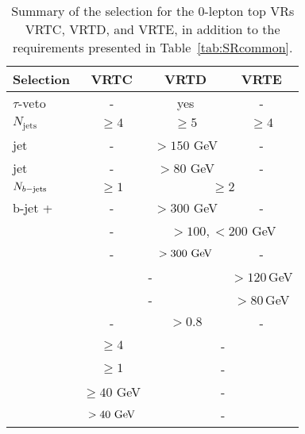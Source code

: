 	\begin{table}[htpb]
	  \caption{Summary of the selection for the $0$-lepton top \acp{VR} VRTC, VRTD, and VRTE, in addition to the requirements presented in Table~\ref{tab:SRcommon}.}
	  \begin{center}
	    \def\arraystretch{1.4}%
	    \begin{tabular}{lccc}
	    \toprule
	      \textbf{Selection}   & \textbf{VRTC}                & \textbf{VRTD}     & \textbf{VRTE}                   \\ \toprule
	      $\tau$-veto          & -                     & yes        & -                        \\ %
	      $N_{\mathrm{jets}}$  & $\ge4$         & $\ge 5$ & $\ge4$       \\ %
	      jet \ptone           & -              & $>150$ GeV & -                        \\ %
	      jet \ptthree         & -              & $>80$ GeV & -                        \\ %
	      $N_{b\mathrm{-jets}}$           & $\ge1$         & \multicolumn{2}{c}{ $\geq 2$  }       \\ %
	      b-jet \ptzero+\ptone & -              & $>300$ GeV & -                        \\ %
	      \midrule
	      \mtbmin              & -              & \multicolumn{2}{c}{ $>100,<200$ GeV  } \\ 
	      \mtbmax              & -              & $>300\gev$ & -                        \\ %
	      \mantikteightzero    & \multicolumn{2}{c}{-} & $>120\,$GeV                           \\ %
	      \mantikteightone     & \multicolumn{2}{c}{-} & $>80\,$GeV                            \\ %
	      \midrule
	      \drbjetbjet          & -              & $>0.8$     & -                        \\ %
	      \nJetS               & $\ge4$         & \multicolumn{2}{c}{-}                 \\ %
	      \nBJetS              & $\ge1$         & \multicolumn{2}{c}{-}                 \\ %
	      \pTSBZero            & $\ge 40$ GeV   & \multicolumn{2}{c}{-}                 \\ %
	      \pTSFour             & $>40\gev$ & \multicolumn{2}{c}{-}                \\ %

\end{tabular}
\end{center}
\end{table}
